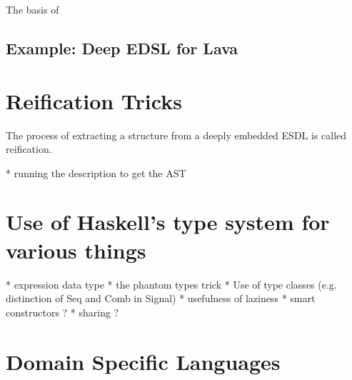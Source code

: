 \documentclass[11pt]{article}
\begin{document}
The basis of 

\subsection{Example: Deep EDSL for Lava}



\section{Reification Tricks}

The process of extracting a structure from a deeply embedded ESDL
is called reification. 



 * running the description to get the AST 

\section{Use of Haskell’s type system for various things }

 * expression data type 
 * the phantom types trick 
 * Use of type classes (e.g. distinction of Seq and Comb in Signal) 
 * usefulness of laziness 
 * smart constructors ? 
 * sharing ?



\section{Domain Specific Languages}
\end{document}
